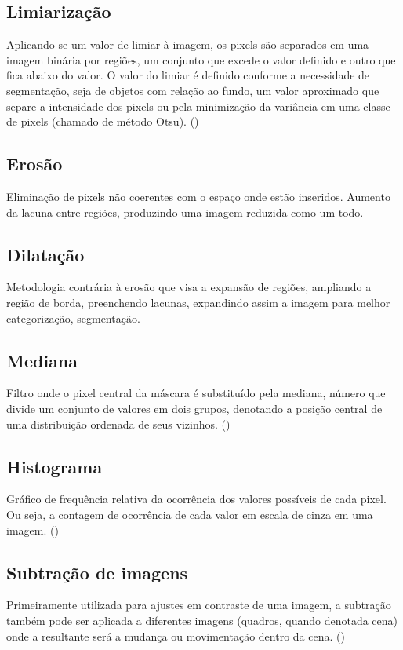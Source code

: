 \documentclass[12pt,oneside,a4paper,chapter=TITLE,section=TITLE,sumario=tradicional]{abntex2}
\begin{document}
\subsection{Limiarização}
Aplicando-se um valor de limiar à imagem, os pixels são separados em uma imagem binária por regiões, um conjunto que excede o valor definido e outro que fica abaixo do valor. O valor do limiar é definido conforme a necessidade de segmentação, seja de objetos com relação ao fundo, um valor aproximado que separe a intensidade dos pixels ou pela minimização da variância em uma classe de pixels (chamado de método Otsu). () 

\subsection{Erosão}
Eliminação de pixels não coerentes com o espaço onde estão inseridos. Aumento da lacuna entre regiões, produzindo uma imagem reduzida como um todo.

\subsection{Dilatação}
Metodologia contrária à erosão que visa a expansão de regiões, ampliando a região de borda, preenchendo lacunas, expandindo assim a imagem para melhor categorização, segmentação.

\subsection{Mediana}
Filtro onde o pixel central da máscara é substituído pela mediana, número que divide um conjunto de valores em dois grupos, denotando a posição central de uma distribuição ordenada de seus vizinhos. ()

\subsection{Histograma}
Gráfico de frequência relativa da ocorrência dos valores possíveis de cada pixel. Ou seja, a contagem de ocorrência de cada valor em escala de cinza em uma imagem. ()

\subsection{Subtração de imagens}
Primeiramente utilizada para ajustes em contraste de uma imagem, a subtração também pode ser aplicada a diferentes imagens (quadros, quando denotada cena) onde a resultante será a mudança ou movimentação dentro da cena. ()
\end{document}
